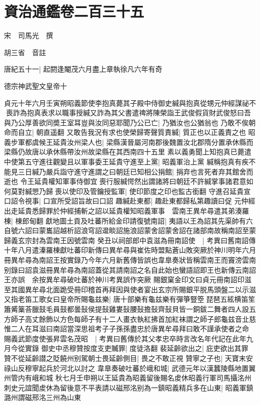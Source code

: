 \chapter{資治通鑑卷二百三十五}
宋　司馬光　撰

胡三省　音註

唐紀五十一|{
	起閼逢閹茂六月盡上章執徐凡六年有奇}


德宗神武聖文皇帝十

貞元十年六月壬寅朔昭義節使李抱真薨其子殿中侍御史緘與抱真從甥元仲經謀祕不喪詐為抱真表求以職事授緘又詐為其父書遣禆將陳榮詣王武俊假貨財武俊怒曰吾與乃公厚善欲同奬王室耳豈與汝同惡耶聞乃公已亡|{
	乃猶汝也公猶翁也}
乃敢不俟朝命而自立|{
	朝直遥翻}
又敢告我況有求也使榮歸寄聲質責緘|{
	質正也以正義責之也}
昭義步軍都虞候王延貴汝州梁人也|{
	梁縣漢晉屬河南郡後魏置汝北郡隋分置承休縣而梁縣仍故唐以承休縣帶汝州故梁縣在其西南四十五里}
素以義勇聞上知抱真已薨遣中使第五守進往觀變且以軍事委王延貴守進至上黨|{
	昭義軍治上黨}
緘稱抱真有疾不能見三日緘乃嚴兵詣守進守進謂之曰朝廷已知相公捐館|{
	捐弃也言死者弃其館舍而逝也}
令王延貴權知軍事侍御宜喪行服緘愕然出謂諸將曰朝廷不許緘掌事諸君意如何莫對緘愳乃歸喪以使印及管鑰授監軍|{
	使印節度之印也監古銜翻}
守進召延貴宣口詔令視事|{
	口宣所受詔旨故曰口詔}
趣緘赴東都|{
	趣赴東都歸私第趣讀曰促}
元仲經出走延貴悉歸罪於仲經捕斬之詔以延貴權知昭義軍事　雲南王異牟尋遣其弟湊羅棟|{
	棟郎甸翻}
獻地圖土貢及吐蕃所給金印請復號南詔|{
	夷語以王為詔其先渠帥有六自號六詔曰蒙巂詔越析詔浪穹詔邆睒詔施浪詔蒙舍詔蒙舍詔在諸部南故稱南詔至蒙歸義玄宗封為雲南王因號雲南}
癸丑以祠部郎中袁滋為冊南詔使　|{
	考異曰舊南詔傳十年八月遣溱羅棟獻吐蕃印新傳曰異牟尋與崔佐時盟點蒼山敗突厥於神川明年六月冊異牟尋為南詔王按實錄乃今年六月新舊傳皆誤也韋臯奏狀皆稱雲南王而竇滂雲南别錄曰詔袁滋冊異牟尋為南詔蓋從其請南詔之名自此始也蠻語詔即王也新傳云南詔王亦誤　余按異牟尋破吐蕃於神川考異誤作突厥}
賜銀窠金印文曰貞元冊南詔印滋至其國異牟尋北面跪受冊印稽首再拜因與使者宴出玄宗所賜銀平脱馬頭盤二以示滋又指老笛工歌女曰皇帝所賜龜兹樂|{
	唐十部樂有龜兹樂有彈箏豎箜琵琶五絃横笛笙簫觱篥荅臘鼓毛員鼓都曇鼔侯提鼔雞婁鼔腰鼔擔鼔齊鼔貝皆一銅鈸二舞者四人設五方師子高丈餘飾以方色每師子有十二人畫衣執紅拂首加紅袜謂之師子郎龜兹音㐀慈}
惟二人在耳滋曰南詔當深思祖考子子孫孫盡忠於唐異牟尋拜曰敢不謹承使者之命　賜義武節度使張昇雲名茂昭　|{
	考異曰舊傳於其父孝忠卒時言改名年代記在此年九月今從實錄}
御史中丞穆贊按度支吏贓罪|{
	度徒洛翻}
裴延齡欲出之|{
	庇吏欲出其罪}
贊不從延齡譛之貶饒州别駕朝士畏延齡側目|{
	畏之不敢正視}
贊寧之子也|{
	天寶末安祿山反穆寧起兵於河北以討之}
韋臯奏破吐蕃於峨和城|{
	武德元年以漢蠶陵縣地置翼州管内有峨和城}
秋七月壬申朔以王延貴為昭義留後賜名䖍休昭義行軍司馬攝洺州刺史元誼聞䖍休為留後意不平表請以磁邢洺别為一鎮昭義精兵多在山東|{
	昭義軍鎮潞州謂磁邢洺三州為山東}
